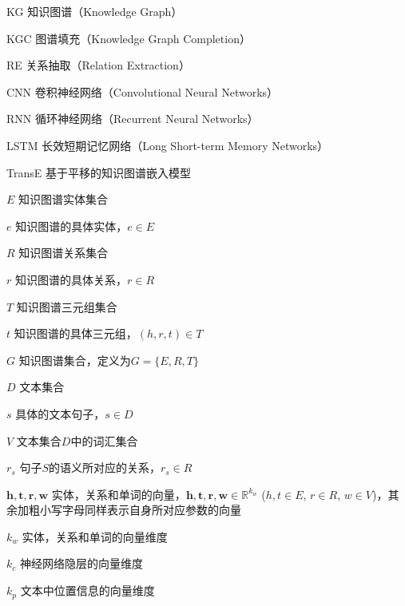 \begin{denotation}[3cm]
\item[KG] 知识图谱（Knowledge Graph）
\item[KGC] 图谱填充（Knowledge Graph Completion）
\item[RE] 关系抽取（Relation Extraction）
\item[CNN] 卷积神经网络（Convolutional Neural Networks）
\item[RNN] 循环神经网络（Recurrent Neural Networks）
\item[LSTM] 长效短期记忆网络（Long Short-term Memory Networks）
\item[TransE] 基于平移的知识图谱嵌入模型
\item[$E$] 知识图谱实体集合
\item[$e$] 知识图谱的具体实体，$e \in E$
\item[$R$] 知识图谱关系集合
\item[$r$] 知识图谱的具体关系，$r \in R$
\item[$T$] 知识图谱三元组集合
\item[$t$] 知识图谱的具体三元组，$(h, r, t) \in T$
\item[$G$] 知识图谱集合，定义为$G = \{E, R, T\}$
\item[$D$] 文本集合
\item[$s$] 具体的文本句子，$s \in D$
\item[$V$] 文本集合$D$中的词汇集合
\item[$r_s$] 句子$S$的语义所对应的关系，$r_s \in R$
\item[$\textbf{h}, \textbf{t}, \textbf{r}, \textbf{w}$]	实体，关系和单词的向量，$\mathbf{h}, \mathbf{t}, \mathbf{r}, \mathbf{w} \in \mathbb{R}^{k_w}$ ($h, t \in E$, $r \in R$, $w \in V$)，其余加粗小写字母同样表示自身所对应参数的向量
\item[$k_w$] 实体，关系和单词的向量维度
\item[$k_c$] 神经网络隐层的向量维度
\item[$k_p$] 文本中位置信息的向量维度
\end{denotation}

